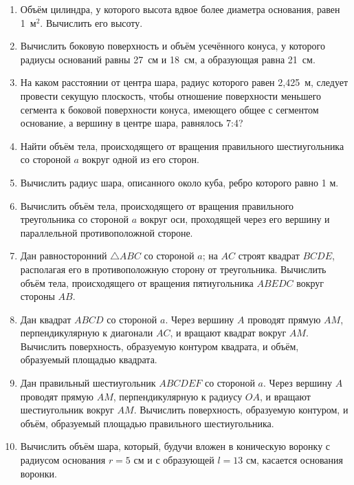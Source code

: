 \begin{enumerate}

\item 
Объём цилиндра, у которого высота вдвое более диаметра основания, равен 1~м$^2$.
Вычислить его высоту.

\item
Вычислить боковую поверхность и объём усечённого конуса, у которого радиусы оснований равны 27~см и 18~см, а образующая равна 21~см.

\item
На каком расстоянии от центра шара, радиус которого равен 2,425~м, следует провести секущую плоскость, чтобы отношение поверхности меньшего сегмента к боковой поверхности конуса, имеющего общее с сегментом основание, а вершину в центре шара, равнялось 7:4?

\item
Найти объём тела, происходящего от вращения правильного шестиугольника со стороной $a$ вокруг одной из его сторон.

\item
Вычислить радиус шара, описанного около куба, ребро которого равно 1 м.

\item
Вычислить объём тела, происходящего от вращения правильного треугольника со стороной $a$ вокруг оси, проходящей через его вершину и параллельной противоположной стороне.

\item
Дан равносторонний $\triangle ABC$ со стороной $a$;
на $AC$ строят квадрат $BCDE$, располагая его в противоположную сторону от треугольника.
Вычислить объём тела, происходящего от вращения пятиугольника $ABEDC$ вокруг стороны $AB$.

\item
Дан квадрат $ABCD$ со стороной $a$.
Через вершину $A$ проводят прямую $AM$, перпендикулярную к диагонали $AC$, и вращают квадрат вокруг $AM$.
Вычислить поверхность, образуемую контуром квадрата, и объём, образуемый площадью квадрата.

\item
Дан правильный шестиугольник $ABCDEF$ со стороной $a$.
Через вершину $A$ проводят прямую $AM$, перпендикулярную к радиусу $OA$, и вращают шестиугольник вокруг $AM$.
Вычислить поверхность, образуемую контуром, и объём, образуемый площадью правильного шестиугольника.


\item
Вычислить объём шара, который, будучи вложен в коническую воронку с радиусом основания $r = 5$ см и с образующей $l = 13$ см, касается основания воронки.


\end{enumerate}

